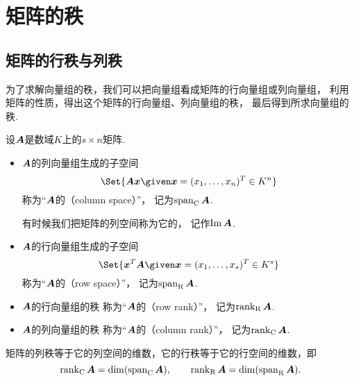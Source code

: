 \section{矩阵的秩}
\subsection{矩阵的行秩与列秩}
为了求解向量组的秩，我们可以把向量组看成矩阵的行向量组或列向量组，
利用矩阵的性质，得出这个矩阵的行向量组、列向量组的秩，
最后得到所求向量组的秩.

\begin{definition}\label{definition:线性方程组.行秩与列秩的定义}
设\(\boldsymbol{A}\)是数域\(K\)上的\(s \times n\)矩阵.
\begin{itemize}
	\item \(\boldsymbol{A}\)的列向量组生成的子空间\begin{equation*}
		\Set{
			\vb{A}\vb{x} \given \vb{x}=(x_1,\dotsc,x_n)^T \in K^n
		}
	\end{equation*}
	称为“\(\boldsymbol{A}\)的（column space）”，
	记为\(\operatorname{span}_{\mathrm{C}}\boldsymbol{A}\).

	有时候我们把矩阵的列空间称为它的，
	记作\(\operatorname{Im}\boldsymbol{A}\).

	\item \(\boldsymbol{A}\)的行向量组生成的子空间\begin{equation*}
		\Set{
			\vb{x}^T\vb{A} \given \vb{x}=(x_1,\dotsc,x_s)^T \in K^s
		}
	\end{equation*}
	称为“\(\boldsymbol{A}\)的（row space）”，
	记为\(\operatorname{span}_{\mathrm{R}}\boldsymbol{A}\).

	\item \(\boldsymbol{A}\)的行向量组的秩
	称为“\(\boldsymbol{A}\)的（row rank）”，
	记为\(\rank_{\mathrm{R}}\boldsymbol{A}\).

	\item \(\boldsymbol{A}\)的列向量组的秩
	称为“\(\boldsymbol{A}\)的（column rank）”，
	记为\(\rank_{\mathrm{C}}\boldsymbol{A}\).
\end{itemize}
\end{definition}

矩阵的列秩等于它的列空间的维数，它的行秩等于它的行空间的维数，即\begin{equation*}
	\rank_{\mathrm{C}}\boldsymbol{A}=\dim(\operatorname{span}_{\mathrm{C}}\boldsymbol{A}), \qquad
	\rank_{\mathrm{R}}\boldsymbol{A}=\dim(\operatorname{span}_{\mathrm{R}}\boldsymbol{A}).
\end{equation*}

